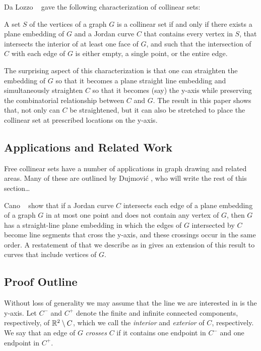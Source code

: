 \documentclass{patmorin}
\begin{document}
Da Lozzo \etal\ \cite{dalozzo.dujmovic.ea:drawing} gave the following
characterization of collinear sets:
\begin{thm}
   A set $S$ of the vertices of a graph $G$ is a collinear set if and
   only if there exists a plane embedding of $G$ and a Jordan curve $C$
   that contains every vertex in $S$, that intersects the interior of
   at least one face of $G$, and such that the intersection of $C$ with
   each edge of $G$ is either empty, a single point, or the entire edge.
\end{thm}
The surprising aspect of this characterization is that one can straighten
the embedding of $G$ so that it becomes a plane straight line embedding
and simultaneously straighten $C$ so that it becomes (say) the y-axis
while preserving the combinatorial relationship between $C$ and $G$. The
result in this paper shows that, not only can $C$ be straightened,
but it can also be stretched to place the collinear set at prescribed
locations on the y-axis.

\subsection{Applications and Related Work}

Free collinear sets have a number of applications in graph drawing
and related areas.  Many of these are outlined by Dujmovi\'c
\cite{dujmovic:utility}, who will write the rest of this section\ldots

Cano \etal\ \cite[Theorem~2]{cano.toth.ea:upper} show that if a Jordan
curve $C$ intersects each edge of a plane embedding of a graph $G$ in
at most one point and does not contain any vertex of $G$, then $G$ has
a straight-line plane embedding in which the edges of $G$ intersected
by $C$ become line segments that cross the y-axis, and these crossings
occur in the same order.  A restatement of  that
we describe as  in  gives an
extension of this result to curves that include vertices of $G$.

\subsection{Proof Outline}

Without loss of generality we may assume that the line we are interested
in is the y-axis.  Let $C^-$ and $C^+$ denote the finite and infinite
connected components, respectively, of $\mathbb{R}^2\setminus C$, which we call
the \emph{interior} and \emph{exterior} of $C$, respectively.  We say
that an edge of $G$ \emph{crosses} $C$ if it contains one endpoint in
$C^-$ and one endpoint in $C^+$.
\end{document}
